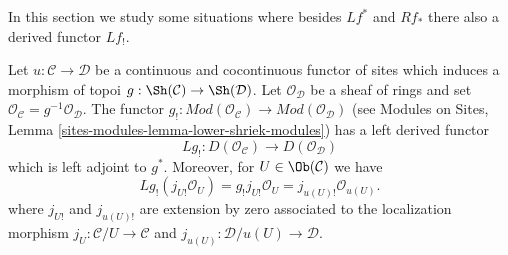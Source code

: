 \noindent
In this section we study some situations where besides $Lf^*$ and
$Rf_*$ there also a derived functor $Lf_!$.

\begin{lemma}
\label{lemma-existence-derived-lower-shriek}
Let $u : \mathcal{C} \to \mathcal{D}$ be a continuous and cocontinuous
functor of sites which induces a morphism of topoi
$g : \Sh(\mathcal{C}) \to \Sh(\mathcal{D})$. Let $\mathcal{O}_\mathcal{D}$
be a sheaf of rings and set
$\mathcal{O}_\mathcal{C} = g^{-1}\mathcal{O}_\mathcal{D}$.
The functor $g_! : \textit{Mod}(\mathcal{O}_\mathcal{C}) \to
\textit{Mod}(\mathcal{O}_\mathcal{D})$
(see
Modules on Sites, Lemma \ref{sites-modules-lemma-lower-shriek-modules})
has a left derived functor
$$
Lg_! : D(\mathcal{O}_\mathcal{C}) \longrightarrow D(\mathcal{O}_\mathcal{D})
$$
which is left adjoint to $g^*$. Moreover, for $U \in \Ob(\mathcal{C})$ we
have
$$
Lg_!(j_{U!}\mathcal{O}_U) =
g_!j_{U!}\mathcal{O}_U =
j_{u(U)!} \mathcal{O}_{u(U)}.
$$
where $j_{U!}$ and $j_{u(U)!}$ are extension by zero associated to the
localization morphism
$j_U : \mathcal{C}/U \to \mathcal{C}$ and
$j_{u(U)} : \mathcal{D}/u(U) \to \mathcal{D}$.
\end{lemma}

